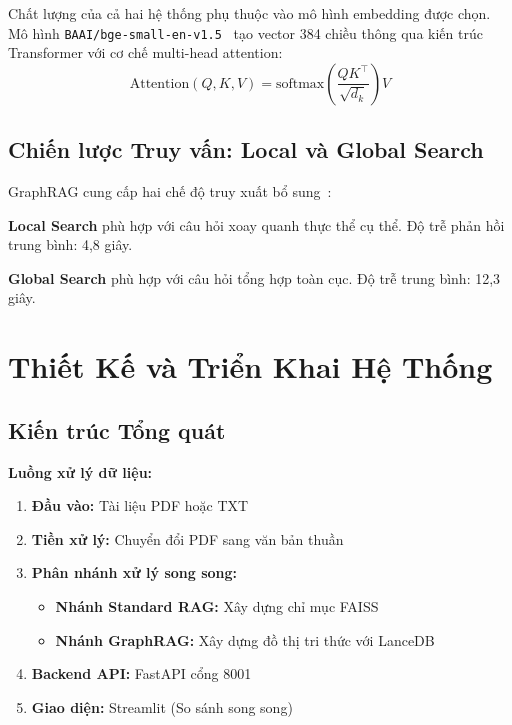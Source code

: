 \documentclass[10pt, conference, a4paper]{IEEEtran}
\begin{document}
Chất lượng của cả hai hệ thống phụ thuộc vào mô hình embedding được
chọn. Mô hình \texttt{BAAI/bge-small-en-v1.5}~\cite{bge2023} tạo
vector 384 chiều thông qua kiến trúc Transformer với cơ chế multi-head
attention:
\begin{equation}
  \text{Attention}(Q,K,V) = \text{softmax}
    \!\left(\frac{QK^\top}{\sqrt{d_k}}\right)\!V
  \label{eq:attention}
\end{equation}

\subsection{Chiến lược Truy vấn: Local và Global Search}

GraphRAG cung cấp hai chế độ truy xuất bổ sung~\cite{edge2024graphrag}:

\textbf{Local Search} phù hợp với câu hỏi xoay quanh thực thể cụ thể.
Độ trễ phản hồi trung bình: 4,8 giây.

\textbf{Global Search} phù hợp với câu hỏi tổng hợp toàn cục.
Độ trễ trung bình: 12,3 giây.

\section{Thiết Kế và Triển Khai Hệ Thống}

\subsection{Kiến trúc Tổng quát}

\noindent\textbf{Luồng xử lý dữ liệu:}
\begin{enumerate}
    \item \textbf{Đầu vào:} Tài liệu PDF hoặc TXT
    \item \textbf{Tiền xử lý:} Chuyển đổi PDF sang văn bản thuần
    \item \textbf{Phân nhánh xử lý song song:}
    \begin{itemize}
        \item \textbf{Nhánh Standard RAG:} Xây dựng chỉ mục FAISS
        \item \textbf{Nhánh GraphRAG:} Xây dựng đồ thị tri thức với LanceDB
    \end{itemize}
    \item \textbf{Backend API:} FastAPI cổng 8001
    \item \textbf{Giao diện:} Streamlit (So sánh song song)
\end{enumerate}
\end{document}

